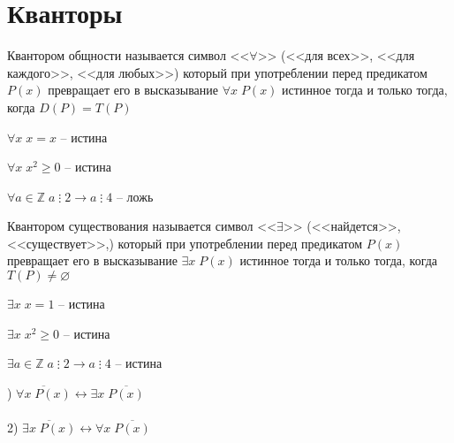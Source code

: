 \section{Кванторы}

\begin{definition}
    Квантором общности называется символ <<$\forall $>> (<<для всех>>, <<для каждого>>, <<для любых>>) который при употреблении перед предикатом $P(x)$
    превращает его в высказывание $\forall x \; P(x)$ истинное тогда и только тогда, когда $D(P) = T(P)$
\end{definition}

\begin{example}
    $\forall x \; x = x$ -- истина
\end{example}

\begin{example}
    $\forall x \; x^2 \ge 0$ -- истина
\end{example}

\begin{example}
    $\forall a \in \mathbb{Z} \; a \; \vdots \; 2 \rightarrow a \; \vdots \; 4 $ -- ложь
\end{example}

\begin{definition}
    Квантором существования называется символ <<$\exists $>> (<<найдется>>, <<существует>>,) который при употреблении перед предикатом $P(x)$
    превращает его в высказывание $\exists x \; P(x)$ истинное тогда и только тогда, когда $T(P) \ne \varnothing $
\end{definition}

\begin{example}
    $\exists x \; x = 1$ -- истина
\end{example}

\begin{example}
    $\exists x \; x^2 \ge 0$ -- истина
\end{example}

\begin{example}
    $\exists a \in \mathbb{Z} \; a \; \vdots \; 2 \rightarrow a \; \vdots \; 4 $ -- истина
\end{example}

\newpage

\begin{theorem} \label{thm:3.2.7}
    \hfill \break {}) $\overline{\forall x \; P(x)} \leftrightarrow \exists x \; \overline{P(x)}$ \\ \\
    2) $\overline{\exists x \; P(x)} \leftrightarrow \forall x \; \overline{P(x)}$
\end{theorem}

